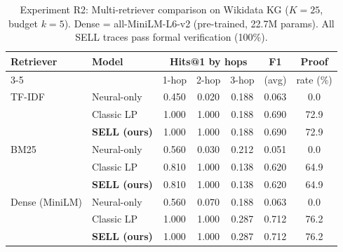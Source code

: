 \begin{table}[t]
\centering
\caption{Experiment R2: Multi-retriever comparison on Wikidata KG ($K{=}25$, budget $k{=}5$). Dense = all-MiniLM-L6-v2 (pre-trained, 22.7M params). All SELL traces pass formal verification (100\%).}
\label{tab:multi_retriever}
\small
\begin{tabular}{llccccc}
\toprule
Retriever & Model & \multicolumn{3}{c}{Hits@1 by hops} & F1 & Proof \\
\cmidrule(lr){3-5}
 & & 1-hop & 2-hop & 3-hop & (avg) & rate (\%) \\
\midrule
  TF-IDF & Neural-only & 0.450 & 0.020 & 0.188 & 0.063 & 0.0 \\
   & Classic LP & 1.000 & 1.000 & 0.188 & 0.690 & 72.9 \\
   & \textbf{SELL (ours)} & 1.000 & 1.000 & 0.188 & 0.690 & 72.9 \\
\midrule
  BM25 & Neural-only & 0.560 & 0.030 & 0.212 & 0.051 & 0.0 \\
   & Classic LP & 0.810 & 1.000 & 0.138 & 0.620 & 64.9 \\
   & \textbf{SELL (ours)} & 0.810 & 1.000 & 0.138 & 0.620 & 64.9 \\
\midrule
  Dense (MiniLM) & Neural-only & 0.560 & 0.070 & 0.188 & 0.063 & 0.0 \\
   & Classic LP & 1.000 & 1.000 & 0.287 & 0.712 & 76.2 \\
   & \textbf{SELL (ours)} & 1.000 & 1.000 & 0.287 & 0.712 & 76.2 \\
\bottomrule
\end{tabular}
\end{table}